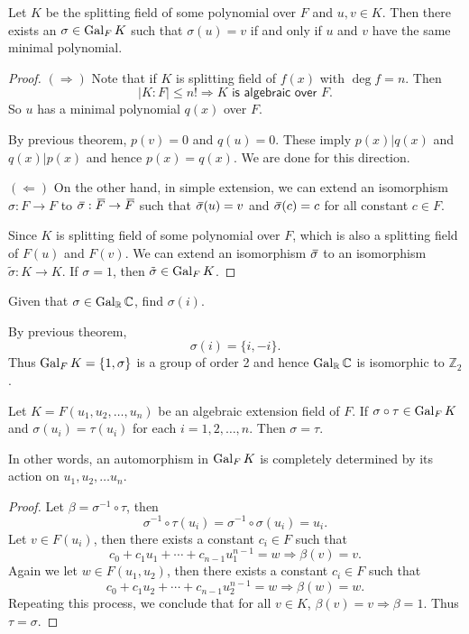 \begin{theorem}
    Let $K$ be the splitting field of some polynomial over $F$ and $u,v \in K$. Then there exists an $\sigma \in \operatorname{Gal}_F K$ 
    such that $\sigma(u) = v$ if and only if $u$ and $v$ have the same minimal polynomial. 
\end{theorem}
\begin{proof}
    $(\Rightarrow)$ Note that if $K$ is splitting field of $f(x)$ with $\deg f = n$. Then 
    \[
        |K:F| \leq n! \Longrightarrow K \textsf{ is algebraic over } F.
    \]
    So $u$ has a minimal polynomial $q(x)$ over $F$.

    By previous theorem, $p(v) = 0$ and $q(u) = 0$. These imply $p(x) | q(x)$ and 
    $q(x) | p(x)$ and hence $p(x) = q(x)$. We are done for this direction.

    $(\Leftarrow)$ On the other hand, in simple extension, we can extend an isomorphism 
    $\sigma: F \to F$ to $\,\overline{\!{\sigma}}: \,\overline{\!{F}} \to \,\overline{\!{F}}$ such that 
    $\,\overline{\!{\sigma}}(u) = v$ and $\,\overline{\!{\sigma}}(c) = c$ for all constant $c \in F$. 

    Since $K$ is splitting field of some polynomial over $F$, which is also a splitting field of 
    $F(u)$ and $F(v)$. We can extend an isomorphism $\,\overline{\!{\sigma}}$ to an isomorphism 
    $\tilde{\sigma}: K \to K$. If $\sigma = 1$, then $\tilde{\sigma} \in \operatorname{Gal}_F K$.
\end{proof}

\begin{example}
    Given that $\sigma \in \operatorname{Gal}_\mathbb{R} \mathbb{C}$, find $\sigma(i)$.
\end{example}
\begin{solution}
    By previous theorem,
    \[
        \sigma(i) = \{ i, - i \}.
    \]
    Thus $\operatorname{Gal}_F K = \{1, \sigma \}$ is a group of order 2 and hence $\operatorname{Gal}_\mathbb{R} \mathbb{C}$ 
    is isomorphic to $\mathbb{Z}_2$.
\end{solution}

\begin{theorem}
    Let $K = F(u_1, u_2, \ldots, u_n)$ be an algebraic extension field of $F$. If 
    $\sigma \circ \tau \in \operatorname{Gal}_F K $ and $\sigma(u_i) = \tau(u_i)$ for each $i = 1,2,\ldots, n$.
    Then $\sigma = \tau$.

    In other words, an automorphism in $\operatorname{Gal}_F K$ is completely determined by its action 
    on $u_1, u_2, \ldots u_n$.
\end{theorem}
\begin{proof}
    Let $\beta = \sigma^{-1} \circ \tau$, then 
    \[
        \sigma^{-1} \circ \tau (u_i) = \sigma^{-1} \circ \sigma(u_i) = u_i.
    \]
    Let $v \in F(u_i)$, then there exists a constant $c_i \in F$ such that 
    \[
        c_0 + c_1u_1 + \cdots + c_{n-1}u^{n-1}_1 = w \Longrightarrow \beta(v) = v.
    \]
    Again we let $w \in F(u_1, u_2)$, then there exists a constant $c_i \in F$ such that 
    \[
        c_0 + c_1u_2 + \cdots + c_{n-1}u^{n-1}_2 = w \Longrightarrow \beta(w) = w.
    \]
    Repeating this process, we conclude that for all $v \in K$, $\beta(v) = v \Longrightarrow \beta = 1$.
    Thus $\tau = \sigma$.
\end{proof}

